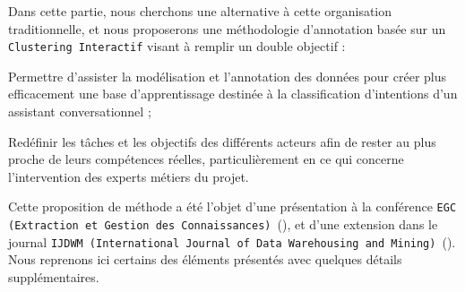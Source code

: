 	Dans cette partie, nous cherchons une alternative à cette organisation traditionnelle, et nous proposerons une méthodologie d'annotation basée sur un \texttt{Clustering Interactif} visant à remplir un double objectif :
	\begin{leftBarImportantRed}
		\begin{todolist}
			\item Permettre d'assister la modélisation et l'annotation des données pour créer plus efficacement une base d'apprentissage destinée à la classification d'intentions d'un assistant conversationnel ;
			\item Redéfinir les tâches et les objectifs des différents acteurs afin de rester au plus proche de leurs compétences réelles, particulièrement en ce qui concerne l'intervention des experts métiers du projet.
		\end{todolist}
	\end{leftBarImportantRed}
	
	\begin{leftBarInformation}
		Cette proposition de méthode a été l'objet d'une présentation à la conférence \texttt{EGC (Extraction et Gestion des Connaissances)}~(\cite{schild-etal:2021:conception-iterative-semisupervisee}), et d'une extension dans le journal \texttt{IJDWM (International Journal of Data Warehousing and Mining)}~(\cite{schild-etal:2022:iterative-semisupervised-design}).
		Nous reprenons ici certains des éléments présentés avec quelques détails supplémentaires.
	\end{leftBarInformation}

	\minitoc


	


	\newpage
	


	